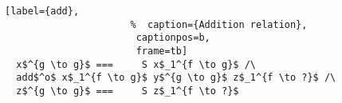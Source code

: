 \begin{figure}[!t]
  \centering
  \begin{minipage}{\columnwidth}
    \begin{lstlisting}[label={add},
                      %  caption={Addition relation},
                       captionpos=b,
                       frame=tb]
  x$^{g \to g}$ ===     S x$_1^{f \to g}$ /\
  add$^o$ x$_1^{f \to g}$ y$^{g \to g}$ z$_1^{f \to ?}$ /\
  z$^{g \to g}$ ===     S z$_1^{f \to ?}$
    \end{lstlisting}
  \end{minipage}
\end{figure}